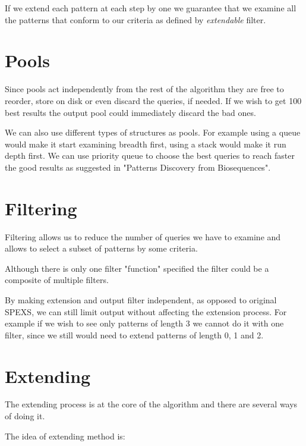 If we extend each pattern at each step by one we guarantee that we examine all the patterns that conform to our criteria as defined by \emph{extendable} filter.

\section{Pools}

Since pools act independently from the rest of the algorithm they are free to reorder, store on disk or even discard the queries, if needed. If we wish to get 100 best results the output pool could immediately discard the bad ones.

We can also use different types of structures as pools. For example using a queue would make it start examining breadth first, using a stack would make it run depth first. We can use priority queue to choose the best queries to reach faster the good results as suggested in "Patterns Discovery from Biosequences"\cite{spexs}.

\section{Filtering}

Filtering allows us to reduce the number of queries we have to examine and allows to select a subset of patterns by some criteria. \eg

Although there is only one filter "function" specified the filter could be a composite of multiple filters.

By making extension and output filter independent, as opposed to original SPEXS, we can still limit output without affecting the extension process. For example if we wish to see only patterns of length 3 we cannot do it with one filter, since we still would need to extend patterns of length 0, 1 and 2.

\section{Extending}

The extending process is at the core of the algorithm and there are several ways of doing it.




\WIP

The idea of extending method is:

